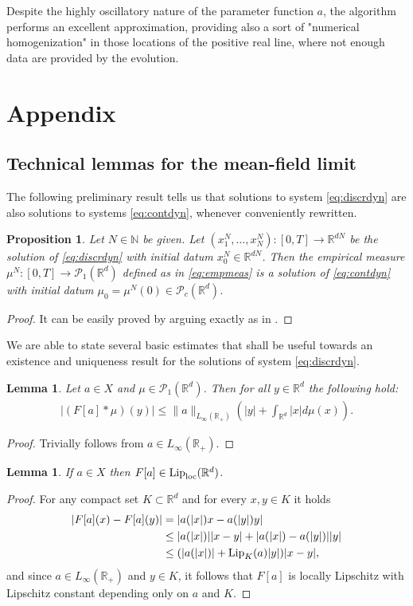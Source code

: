 \documentclass[A4paper,11pt]{article}
\newtheorem{lemma}[theorem]{Lemma}
\newtheorem{proposition}[theorem]{Proposition}
\theoremstyle{definition}
\newcommand{\Lip}{\textup{Lip}}
\newcommand{\loc}{\textup{loc}}
\newcommand{\N}{\mathbb{N}}
\newcommand{\R}{\mathbb{R}}
\newcommand{\PP}{\mathcal{P}_1}
\newcommand{\PC}{\mathcal{P}_c}
\begin{document}
Despite the highly oscillatory nature of the parameter function $a$, the algorithm performs an excellent approximation, providing also a sort of "numerical homogenization" in those locations of the positive real line, where not enough data are provided by the evolution.
\section{Appendix}

\subsection{Technical lemmas for the mean-field limit}\label{ap1}

The following preliminary result tells us that solutions to system \eqref{eq:discrdyn} are also solutions to systems \eqref{eq:contdyn}, whenever conveniently rewritten.

\begin{proposition}\label{p-rewritten}
Let $N \in \N$ be given. Let $(x^N_1, \ldots, x^N_N):[0,T] \rightarrow \R^{dN}$ be the solution of \eqref{eq:discrdyn} with initial datum $x^{N}_0 \in \R^{dN}$. Then the empirical measure $\mu^N:[0,T] \rightarrow \PP(\R^d)$ defined as in \eqref{eq:empmeas} is a solution of \eqref{eq:contdyn} with initial datum $\mu_{0}= \mu^N(0) \in \PC(\R^d)$.
\end{proposition}
\begin{proof}
It can be easily proved by arguing exactly as in \cite[Lemma 4.3]{MFOC}.
\end{proof}

 We are able to state several basic estimates that shall be useful towards an existence and uniqueness result for the solutions of system \eqref{eq:discrdyn}.

\begin{lemma}\label{p-estkernel}
Let $a\in X$ and $\mu \in \PP(\R^d)$. Then for all $y \in \R^d$ the following hold:
\begin{align*}
|(F[a] * \mu)(y)| \leq \|a\|_{L_{\infty}(\R_+)}\left( | y | + \int_{\R^d} | x | d\mu(x) \right).
\end{align*}
\end{lemma}
\begin{proof}
Trivially follows from $a \in L_{\infty}(\R_+)$.
\end{proof}

\begin{lemma}\label{p-Floclip}
If $a\in X$ then $F[a] \in \Lip_\loc(\R^d)$.
\end{lemma}
\begin{proof}
For any compact set $K \subset \R^d$ and for every $x,y \in K$ it holds
\begin{align*}
|F[a](x) - F[a](y)| &= |a(|x|)x - a(|y|)y| \\
&\leq |a(|x|)| |x-y| + |a(|x|) - a(|y|)| |y| \\
&\leq (|a(|x|)| + \Lip_K(a) |y|) |x-y|,
\end{align*}
and since $a \in L_{\infty}(\R_+)$ and $y \in K$, it follows that $F[a]$ is locally Lipschitz with Lipschitz constant depending only on $a$ and $K$.
\end{proof}
\end{document}
